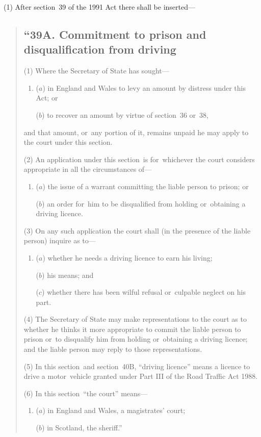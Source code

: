 \documentclass[12pt,a4paper]{article}
\begin{document}
(1) After section~39 of the 1991 Act there shall be inserted—
\begin{quotation}
\subsection*{\sloppy “39A. Commitment to prison and disqualification from driving}

(1) Where the Secretary of State has sought—
\begin{enumerate}\item[]
($a$) in England and Wales to levy an amount by distress under this Act; or

($b$) to recover an amount by virtue of section~36 or~38,
\end{enumerate}
and that amount, or~any portion of it, remains unpaid he may apply to the court under this section.

(2) An application under this section~is for~whichever the court considers appropriate in all the circumstances of—
\begin{enumerate}\item[]
($a$) the issue of a warrant committing the liable person to prison; or

($b$) an order for~him to be disqualified from holding or~obtaining a driving licence.
\end{enumerate}

(3) On any such application the court shall (in the presence of the liable person) inquire as to—
\begin{enumerate}\item[]
($a$) whether he needs a driving licence to earn his living;

($b$) his means; and

($c$) whether there has been wilful refusal or~culpable neglect on his part.
\end{enumerate}

(4) The Secretary of State may make representations to the court as to whether he thinks it more appropriate to commit the liable person to prison or~to disqualify him from holding or~obtaining a driving licence; and the liable person may reply to those representations.

(5) In this section~and section~40B, “driving licence” means a licence to drive a motor~vehicle granted under Part III of the Road Traffic Act 1988. 

(6) In this section~“the court” means—
\begin{enumerate}\item[]
($a$) in England and Wales, a magistrates' court;

($b$) in Scotland, the sheriff.”
\end{enumerate}
\end{quotation}
\end{document}

